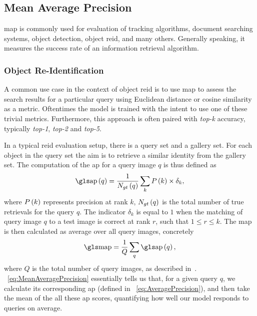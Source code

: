 \subsection{Mean Average Precision}
\label{ssec:MeanAveragePrecision}


\Gls{map} is commonly used for evaluation of tracking algorithms, document searching systems, object detection, object \gls{reid}, and many others. Generally speaking, it measures the success rate of an information retrieval algorithm.

\subsubsection{Object Re-Identification}
\label{sssec:ObjectReIdentification}

A common use case in the context of object \gls{reid} is to use \gls{map} to assess the search results for a particular query using Euclidean distance or cosine similarity as a metric. Oftentimes the model is trained with the intent to use one of these trivial metrics. Furthermore, this approach is often paired with \emph{top-k} accuracy, typically \emph{top-1}, \emph{top-2} and \emph{top-5}.

In a typical \gls{reid} evaluation setup, there is a query set and a gallery set. For each object in the query set the aim is to retrieve a similar identity from the gallery set. The computation of the \gls{ap} for a query image $q$ is thus defined as
\begin{equation}
    \label{eq:AveragePrecision}
    \func{\AP}{q} = \frac{1}{\func{N_{gt}}{q}} \sum_{k} \func{P}{k} \times {\delta}_k,
\end{equation}
where ${P} \left( k \right)$ represents precision at rank $k$, ${N_{gt}} \left( q \right)$ is the total number of true retrievals for the query $q$. The indicator ${\delta}_k$ is equal to $1$ when the matching of query image $q$ to a test image is correct at rank $r$, such that $1 \leq r \leq k$. The \gls{map} is then calculated as average over all query images, concretely
\begin{equation}
    \label{eq:MeanAveragePrecision}
    \MAP = \frac{1}{Q} \sum_q \func{\AP}{q},
\end{equation}
where $Q$ is the total number of query images, as described in~\cite{kuma2019vehiclereid}. \eqtext{}~\ref{eq:MeanAveragePrecision} essentially tells us that, for a given query $q$, we calculate its corresponding \gls{ap} (defined in \eqtext{}~\ref{eq:AveragePrecision}), and then take the mean of the all these \gls{ap} scores, quantifying how well our model responds to queries on average.

